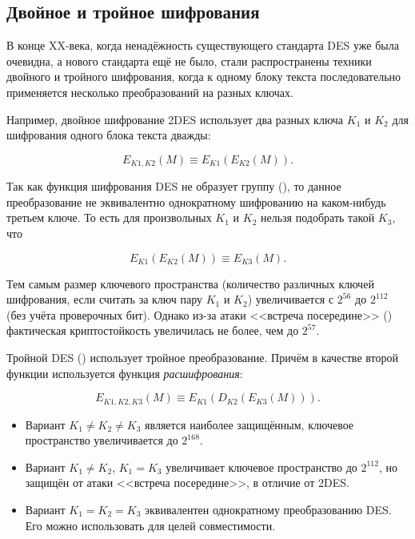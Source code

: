 \subsection{Двойное и тройное шифрования}

В конце XX-века, когда ненадёжность существующего стандарта DES уже была очевидна, а нового стандарта ещё не было, стали распространены техники двойного и тройного шифрования, когда к одному блоку текста последовательно применяется несколько преобразований на разных ключах.

Например, двойное шифрование 2DES использует два разных ключа $K_1$ и $K_2$ для шифрования одного блока текста дважды:

\[ E_{K1, K2} \left( M \right) \equiv E_{K1} \left( E_{K2} \left( M \right) \right). \]

Так как функция шифрования DES не образует группу (\cite{Kaliski:Rivest:Sherman:1988, Campbell:Wiener:1993}), то данное преобразование не эквивалентно однократному шифрованию на каком-нибудь третьем ключе. То есть для произвольных $K_1$ и $K_2$ нельзя подобрать такой $K_3$, что

\[E_{K1} \left( E_{K2} \left( M \right) \right) \equiv E_{K3} \left( M \right).\]

Тем самым размер ключевого пространства (количество различных ключей шифрования, если считать за ключ пару $K_1$ и $K_2$) увеличивается с $2^{56}$ до $2^{112}$ (без учёта проверочных бит). Однако из-за атаки <<встреча посередине>> () фактическая криптостойкость увеличилась не более, чем до $2^{57}$.

Тройной DES () использует тройное преобразование. Причём в качестве второй функции используется функция \emph{расшифрования}:

\[ E_{K1, K2, K3} \left( M \right) \equiv E_{K1} \left( D_{K2} \left( E_{K3} \left( M \right) \right) \right). \]

\begin{itemize}
	\item Вариант $K_1 \neq K_2 \neq K_3$ является наиболее защищённым, ключевое пространство увеличивается до $2^{168}$.
	\item Вариант $K_1 \neq K_2$, $K_1 = K_3$ увеличивает ключевое пространство до $2^{112}$, но защищён от атаки <<встреча посередине>>, в отличие от 2DES.
	\item Вариант $K_1 = K_2 = K_3$ эквивалентен однократному преобразованию DES. Его можно использовать для целей совместимости.
\end{itemize}

